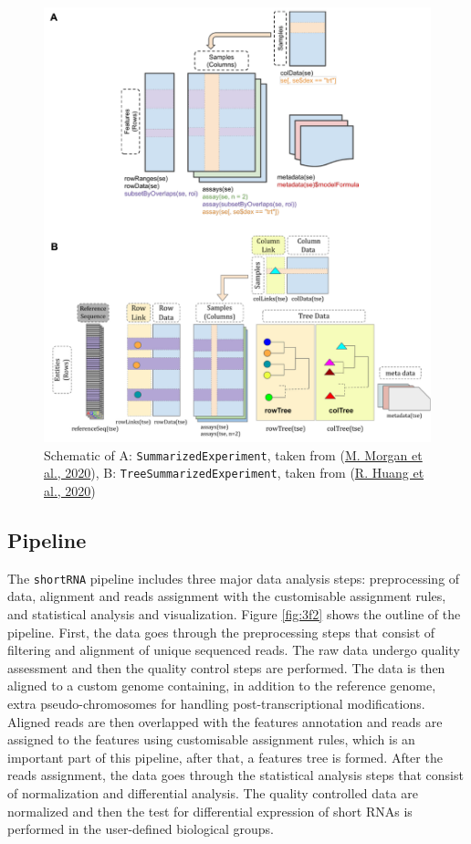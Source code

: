 \documentclass[12pt,twoside]{reedthesis}
\begin{document}
\begin{figure}[htbp]

{\centering \includegraphics{thesis_files/figure-latex/3f1-1} 

}

\caption{Schematic of A: \texttt{SummarizedExperiment}, taken from
(\protect\hyperlink{ref-morgan2020}{M. Morgan et al., 2020}), B: \texttt{TreeSummarizedExperiment}, taken from (\protect\hyperlink{ref-huang2020}{R. Huang et al., 2020})}\label{fig:3f1}
\end{figure}
\hypertarget{pipeline}{%
\subsection{Pipeline}\label{pipeline}}

The \texttt{shortRNA} pipeline includes three major data analysis steps:
preprocessing of data, alignment and reads assignment with the
customisable assignment rules, and statistical analysis and
visualization. Figure \ref{fig:3f2} shows the outline of the pipeline.
First, the data goes through the preprocessing steps that consist of
filtering and alignment of unique sequenced reads. The raw data undergo
quality assessment and then the quality control steps are performed. The
data is then aligned to a custom genome containing, in addition to the
reference genome, extra pseudo-chromosomes for handling
post-transcriptional modifications. Aligned reads are then overlapped
with the features annotation and reads are assigned to the features
using customisable assignment rules, which is an important part of this
pipeline, after that, a features tree is formed. After the reads
assignment, the data goes through the statistical analysis steps that
consist of normalization and differential analysis. The quality
controlled data are normalized and then the test for differential
expression of short RNAs is performed in the user-defined biological
groups.
\end{document}
